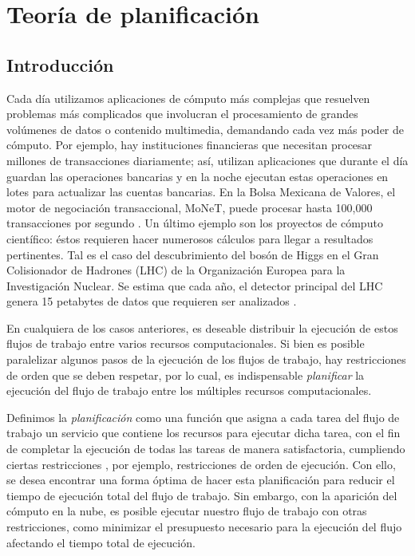 \chapter{Teoría de planificación}
\label{chap:scheduling_teory}

\section{Introducción}
\label{secc:intro}

Cada día utilizamos aplicaciones de cómputo más complejas que resuelven problemas más complicados que involucran el procesamiento de grandes volúmenes de datos o contenido multimedia, demandando cada vez más poder de cómputo. Por ejemplo, hay instituciones financieras que necesitan procesar millones de transacciones diariamente; así, utilizan aplicaciones que durante el día guardan las operaciones bancarias y en la noche ejecutan estas operaciones en lotes para actualizar las cuentas bancarias. En la Bolsa Mexicana de Valores, el motor de negociación transaccional, MoNeT, puede procesar hasta 100,000 transacciones por segundo \cite{bmv2012informe}. Un último ejemplo son los proyectos de cómputo científico: éstos requieren hacer numerosos cálculos para llegar a resultados pertinentes. Tal es el caso del descubrimiento del bosón de Higgs en el Gran Colisionador de Hadrones (LHC) de la Organización Europea para la Investigación Nuclear. Se estima que cada año, el detector principal del LHC genera 15 petabytes de datos que requieren ser analizados \cite{shiers2007worldwide}. %

En cualquiera de los casos anteriores, es deseable distribuir la ejecución de estos flujos de trabajo entre varios recursos computacionales. Si bien es posible paralelizar algunos pasos de la ejecución de los flujos de trabajo, hay restricciones de orden que se deben respetar, por lo cual, es indispensable \emph{planificar} la ejecución del flujo de trabajo entre los múltiples recursos computacionales.

Definimos la \emph{planificación} como una función que asigna a cada tarea del flujo de trabajo un servicio que contiene los recursos para ejecutar dicha tarea, con el fin de completar la ejecución de todas las tareas de manera satisfactoria, cumpliendo ciertas restricciones \cite{wieczorek2009towards}, por ejemplo, restricciones de orden de ejecución. Con ello, se desea encontrar una forma óptima de hacer esta planificación para reducir el tiempo de ejecución total del flujo de trabajo. Sin embargo, con la aparición del cómputo en la nube, es posible ejecutar nuestro flujo de trabajo con otras restricciones, como minimizar el presupuesto necesario para la ejecución del flujo afectando el tiempo total de ejecución.

